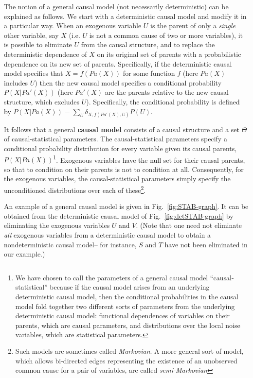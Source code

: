 \documentclass[12pt,onecolumn,nofootinbib]{revtex4-2}
\begin{document}
The notion of a general causal model (not necessarily deterministic) can be explained as follows. We start with a deterministic causal model and modify it in a particular way.  When an exogenous variable $U$ is the parent of only a \emph{single} other variable, say $X$ (i.e. $U$ is not a common cause of two or more variables), it is possible to eliminate $U$ from the causal structure, and to replace the deterministic dependence of $X$ on its original set of parents with a probabilistic dependence on its new set of parents.  Specifically, if the deterministic causal model specifies that $X = f(Pa(X))$ for some function $f$ (here $Pa(X)$ includes $U$) then the new causal model specifies a conditional probability $P(X|Pa'(X))$ (here $Pa'(X)$ are the parents relative to the new causal structure, which excludes $U$). Specifically, the conditional probability is defined by $P(X|Pa(X))=\sum_U \delta_{X,f(Pa'(X),U)}P(U)$.

It follows that a general \textbf{causal model} consists of a causal structure and a set $\Theta$ of
causal-statistical parameters.  The causal-statistical parameters specify a conditional probability distribution for every variable given its causal parents, $P(X|Pa(X))$\footnote{ We have chosen to call the parameters of a general causal model ``causal-statistical'' because if the causal model arises from an underlying deterministic causal model,
then the conditional probabilities in the causal model fold together two different sorts of parameters from the underlying deterministic causal model: functional dependences of variables on their parents, which are causal parameters, and distributions over the local noise variables, which are statistical parameters. \color{black} 
\color{black}}.   Exogenous variables have the null set for their causal parents, so that to condition on their parents is not to condition at all.  Consequently, for the exogenous variables, the causal-statistical parameters simply specify the unconditioned distributions over each of these\footnote{Such models are sometimes called \emph{Markovian}. A more general sort of model, which allows bi-directed edges representing the existence of an unobserved common cause for a pair of variables, are called \emph{semi-Markovian}}.

An example of a general causal model is given in Fig.~\ref{fig:STAB-graph}.  It can be obtained from the deterministic causal model of Fig.~\ref{fig:detSTAB-graph} by eliminating the exogenous variables $U$ and $V$. (Note that one need not eliminate \emph{all} exogenous variables from a deterministic causal model to obtain a nondeterministic causal model-- for instance, $S$ and $T$ have not been eliminated in our example.)
\end{document}
